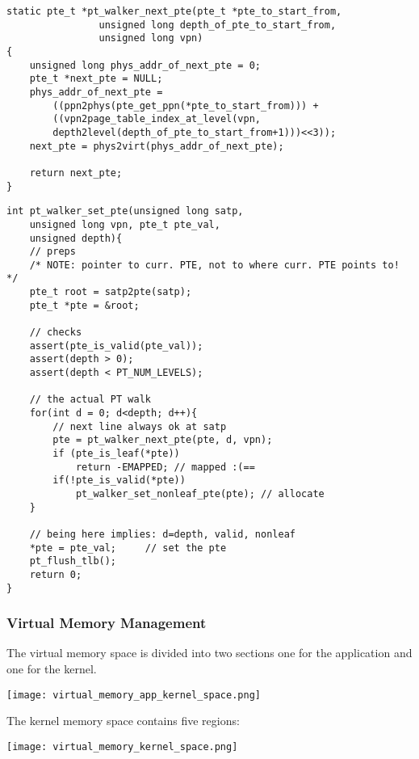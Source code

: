 \begin{lstlisting}[style=bright_C++]
static pte_t *pt_walker_next_pte(pte_t *pte_to_start_from,
                unsigned long depth_of_pte_to_start_from,
                unsigned long vpn)
{
    unsigned long phys_addr_of_next_pte = 0;
    pte_t *next_pte = NULL;
    phys_addr_of_next_pte = 
        ((ppn2phys(pte_get_ppn(*pte_to_start_from))) + 
        ((vpn2page_table_index_at_level(vpn, 
        depth2level(depth_of_pte_to_start_from+1)))<<3));
    next_pte = phys2virt(phys_addr_of_next_pte);

    return next_pte;
}
\end{lstlisting}

\newpar{}
\begin{lstlisting}[style=bright_C++]
int pt_walker_set_pte(unsigned long satp, 
    unsigned long vpn, pte_t pte_val,
    unsigned depth){
    // preps
    /* NOTE: pointer to curr. PTE, not to where curr. PTE points to! */
    pte_t root = satp2pte(satp);
    pte_t *pte = &root;

    // checks
    assert(pte_is_valid(pte_val));
    assert(depth > 0);
    assert(depth < PT_NUM_LEVELS);

    // the actual PT walk
    for(int d = 0; d<depth; d++){
        // next line always ok at satp
        pte = pt_walker_next_pte(pte, d, vpn);		
        if (pte_is_leaf(*pte)) 
            return -EMAPPED; // mapped :(==
        if(!pte_is_valid(*pte)) 
            pt_walker_set_nonleaf_pte(pte); // allocate
    }

    // being here implies: d=depth, valid, nonleaf
    *pte = pte_val;     // set the pte
    pt_flush_tlb();
    return 0;
}
\end{lstlisting}

\subsubsection{Virtual Memory Management}
The virtual memory space is divided into two sections one for the application and one for the kernel.
\begin{center}
    \texttt{[image: virtual\_memory\_app\_kernel\_space.png]}
\end{center}

The kernel memory space contains five regions:

\begin{center}
    \texttt{[image: virtual\_memory\_kernel\_space.png]}
\end{center}

